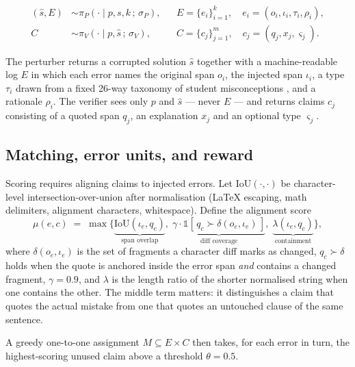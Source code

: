 \documentclass{article} %
\begin{document}
\begin{align}
(\hat{s}, E) &\sim \pi_P\!\left(\cdot \mid p, s, k\,;\, \sigma_P\right),
&& E = \{e_i\}_{i=1}^{k},\quad e_i = (o_i, \iota_i, \tau_i, \rho_i), \label{eq:perturber}\\
C &\sim \pi_V\!\left(\cdot \mid p, \hat{s}\,;\, \sigma_V\right),
&& C = \{c_j\}_{j=1}^{m},\quad c_j = (q_j, x_j, \varsigma_j). \label{eq:verifier}
\end{align}

The perturber returns a corrupted solution $\hat{s}$ together with a machine-readable log
$E$ in which each error names the original span $o_i$, the injected span $\iota_i$, a type
$\tau_i$ drawn from a fixed 26-way taxonomy of student misconceptions
\citep{rittlejohnson2025detecting}, and a rationale $\rho_i$. The verifier sees only $p$
and $\hat{s}$ --- never $E$ --- and returns claims $c_j$ consisting of a quoted span $q_j$,
an explanation $x_j$ and an optional type $\varsigma_j$.

\subsection{Matching, error units, and reward}

Scoring requires aligning claims to injected errors. Let $\mathrm{IoU}(\cdot,\cdot)$ be
character-level intersection-over-union after normalisation (LaTeX escaping, math
delimiters, alignment characters, whitespace). Define the alignment score
\begin{equation}
\mu(e, c) \;=\; \max\Big\{
\underbrace{\mathrm{IoU}(\iota_e, q_c)}_{\text{span overlap}},\;
\underbrace{\gamma \cdot \mathbb{1}\!\left[\,q_c \succ \delta(o_e,\iota_e)\,\right]}_{\text{diff coverage}},\;
\underbrace{\lambda(\iota_e, q_c)}_{\text{containment}}
\Big\},
\label{eq:mu}
\end{equation}
where $\delta(o_e,\iota_e)$ is the set of fragments a character diff marks as changed,
$q_c \succ \delta$ holds when the quote is anchored inside the error span \emph{and}
contains a changed fragment, $\gamma = 0.9$, and $\lambda$ is the length ratio of the
shorter normalised string when one contains the other. The middle term matters: it
distinguishes a claim that quotes the actual mistake from one that quotes an untouched
clause of the same sentence.

A greedy one-to-one assignment $M \subseteq E \times C$ then takes, for each error in turn,
the highest-scoring unused claim above a threshold $\theta = 0.5$.
\end{document}
